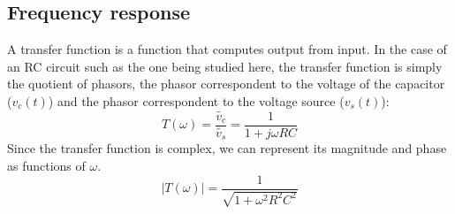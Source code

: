 \subsection{Frequency response}
A transfer function is a function that computes output from input. In the case of an RC circuit such as the one being studied here, the transfer function is simply the quotient of phasors, the phasor correspondent to the voltage of the capacitor ($v_c (t)$) and the phasor correspondent to the voltage source ($v_s (t)$):
\[ T(\omega)= \frac{\widetilde{v_c}}{\widetilde{v_s}}=\frac{1}{1+j\omega R C}\]
Since the transfer function is complex, we can represent its magnitude and phase as functions of $\omega$. 
\[ |T(\omega)|= \frac{1}{\sqrt{1+\omega^2 R^2 C^2}}\]
